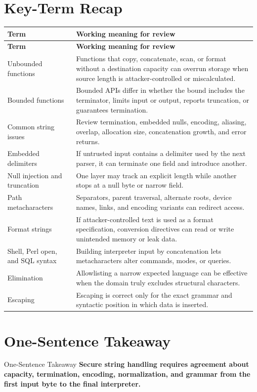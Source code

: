 \documentclass[11pt,letterpaper]{article}
\begin{document}
\section{Key-Term Recap}
\begin{longtable}{>{\raggedright\arraybackslash}p{}p{}}
\toprule
\textbf{Term} & \textbf{Working meaning for review} \\
\midrule
\endfirsthead
\toprule
\textbf{Term} & \textbf{Working meaning for review} \\
\midrule
\endhead
Unbounded functions & Functions that copy, concatenate, scan, or format without a destination capacity can overrun storage when source length is attacker-controlled or miscalculated. \\
Bounded functions & Bounded APIs differ in whether the bound includes the terminator, limits input or output, reports truncation, or guarantees termination. \\
Common string issues & Review termination, embedded nulls, encoding, aliasing, overlap, allocation size, concatenation growth, and error returns. \\
Embedded delimiters & If untrusted input contains a delimiter used by the next parser, it can terminate one field and introduce another. \\
Null injection and truncation & One layer may track an explicit length while another stops at a null byte or narrow field. \\
Path metacharacters & Separators, parent traversal, alternate roots, device names, links, and encoding variants can redirect access. \\
Format strings & If attacker-controlled text is used as a format specification, conversion directives can read or write unintended memory or leak data. \\
Shell, Perl open, and SQL syntax & Building interpreter input by concatenation lets metacharacters alter commands, modes, or queries. \\
Elimination & Allowlisting a narrow expected language can be effective when the domain truly excludes structural characters. \\
Escaping & Escaping is correct only for the exact grammar and syntactic position in which data is inserted. \\
\bottomrule
\end{longtable}
\section{One-Sentence Takeaway}
\begin{CornellExamBox}{One-Sentence Takeaway}
\textbf{Secure string handling requires agreement about capacity, termination, encoding, normalization, and grammar from the first input byte to the final interpreter.}
\end{CornellExamBox}
\end{document}
